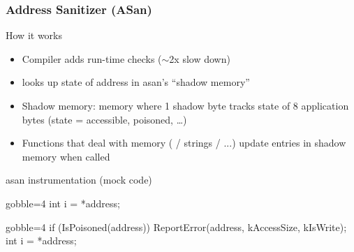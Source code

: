 \begin{frame}[fragile]
  \frametitle{Address Sanitizer (ASan)}
  \begin{block}{How it works}
    \begin{itemize}
      \item Compiler adds run-time checks ($\sim$2x slow down)
      \item {} looks up state of address in asan's ``shadow memory''
      \item Shadow memory: memory where 1 shadow byte tracks state of 8 application bytes (state = accessible, poisoned, \ldots)
      \item Functions that deal with memory ( / strings / ...) update entries in shadow memory when called
    \end{itemize}
  \end{block}
  \begin{exampleblock}{asan instrumentation (mock code)}
    \begin{overprint}
      \vfill
      \begin{cppcode*}{gobble=4}
        int i = *address;
      \end{cppcode*}
      \vfill
      \begin{cppcode*}{gobble=4}
        if (IsPoisoned(address)) {
          ReportError(address, kAccessSize, kIsWrite);
        }
        int i = *address;
      \end{cppcode*}
    \end{overprint}
  \end{exampleblock}
\end{frame}


